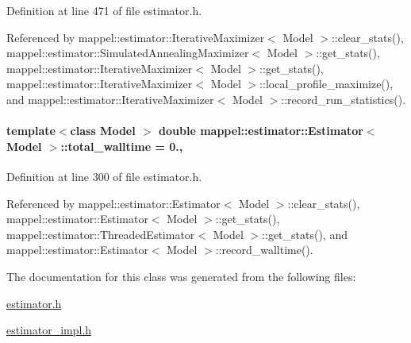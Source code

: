 Definition at line 471 of file estimator.\+h.



Referenced by mappel\+::estimator\+::\+Iterative\+Maximizer$<$ Model $>$\+::clear\+\_\+stats(), mappel\+::estimator\+::\+Simulated\+Annealing\+Maximizer$<$ Model $>$\+::get\+\_\+stats(), mappel\+::estimator\+::\+Iterative\+Maximizer$<$ Model $>$\+::get\+\_\+stats(), mappel\+::estimator\+::\+Iterative\+Maximizer$<$ Model $>$\+::local\+\_\+profile\+\_\+maximize(), and mappel\+::estimator\+::\+Iterative\+Maximizer$<$ Model $>$\+::record\+\_\+run\+\_\+statistics().

\paragraph[{\texorpdfstring{total\+\_\+walltime}{total_walltime}}]{\setlength{\rightskip}{0pt plus 5cm}template$<$class Model $>$ double {\bf mappel\+::estimator\+::\+Estimator}$<$ Model $>$\+::total\+\_\+walltime = 0.\hspace{0.3cm}{\ttfamily [protected]}, {\ttfamily [inherited]}}\hypertarget{classmappel_1_1estimator_1_1Estimator_a98ad459e850aeb2c42c10fd06c3b9fbc}{}\label{classmappel_1_1estimator_1_1Estimator_a98ad459e850aeb2c42c10fd06c3b9fbc}


Definition at line 300 of file estimator.\+h.



Referenced by mappel\+::estimator\+::\+Estimator$<$ Model $>$\+::clear\+\_\+stats(), mappel\+::estimator\+::\+Estimator$<$ Model $>$\+::get\+\_\+stats(), mappel\+::estimator\+::\+Threaded\+Estimator$<$ Model $>$\+::get\+\_\+stats(), and mappel\+::estimator\+::\+Estimator$<$ Model $>$\+::record\+\_\+walltime().



The documentation for this class was generated from the following files\+:\begin{DoxyCompactItemize}
\item 
\hyperlink{estimator_8h}{estimator.\+h}\item 
\hyperlink{estimator__impl_8h}{estimator\+\_\+impl.\+h}\end{DoxyCompactItemize}
